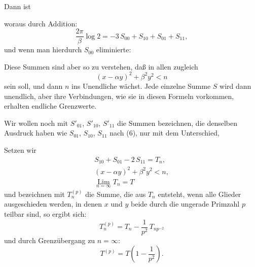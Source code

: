 
Dann ist

woraus durch Addition:
\[
\frac{2\pi}{\beta}\log 2 = -3\,S_{00} + S_{10} + S_{01} + S_{11},
\]
und wenn man hierdurch $S_{00}$ eliminierte:

Diese Summen sind aber so zu verstehen, daß in allen zugleich
\[
(x-\alpha y)^2 + \beta^2 y^2 < n
\]
sein soll, und dann $n$ ins Unendliche wächst. Jede einzelne Summe $S$ wird dann
unendlich, aber ihre Verbindungen, wie sie in diesen Formeln vorkommen, erhalten
endliche Grenzwerte.

Wir wollen noch mit $S'_{01}$, $S'_{10}$, $S'_{11}$ die Summen bezeichnen, die denselben
Ausdruck haben wie $S_{01}$, $S_{10}$, $S_{11}$ nach (6), nur mit dem Unterschied, 

Setzen wir
\[
\begin{gathered}
S_{10} + S_{01} - 2\,S_{11} = T_n,\\
(x-\alpha y)^2 + \beta^2 y^2 < n,\\
\mathop{\mathrm{Lim}}\limits_{n=\infty} T_n = T
\end{gathered}
\]
und bezeichnen mit $T_n^{(p)}$ die Summe, die aus $T_n$ entsteht, wenn alle Glieder
ausgeschieden werden, in denen $x$ und $y$ beide durch die ungerade Primzahl $p$ teilbar
sind, so ergibt sich:
\[
T_n^{(p)} = T_n - \frac{1}{p^2}\,T_{np^{-2}}
\]
und durch Grenzübergang zu $n=\infty$:
\[
T^{(p)} = T\left(1 - \frac{1}{p^2}\right).
\]

